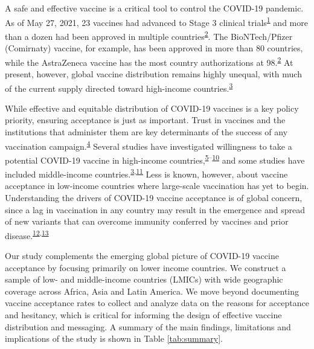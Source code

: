 \documentclass[
  12pt,
]{article}
\begin{document}
\newpage

A safe and effective vaccine is a critical tool to control the COVID-19 pandemic. As of May 27, 2021, 23 vaccines had advanced to Stage 3 clinical trials\textsuperscript{\protect\hyperlink{ref-who1}{1}} and more than a dozen had been approved in multiple countries\textsuperscript{\protect\hyperlink{ref-track}{2}}. The BioNTech/Pfizer (Comirnaty) vaccine, for example, has been approved in more than 80 countries, while the AstraZeneca vaccine has the most country authorizations at 98.\textsuperscript{\protect\hyperlink{ref-track}{2}} At present, however, global vaccine distribution remains highly unequal, with much of the current supply directed toward high-income countries.\textsuperscript{\protect\hyperlink{ref-wouters2021challenges}{3}}

While effective and equitable distribution of COVID-19 vaccines is a key policy priority, ensuring acceptance is just as important. Trust in vaccines and the institutions that administer them are key determinants of the success of any vaccination campaign.\textsuperscript{\protect\hyperlink{ref-defigueiredo2020lancet}{4}} Several studies have investigated willingness to take a potential COVID-19 vaccine in high-income countries,\textsuperscript{\protect\hyperlink{ref-boyon2020ipsos}{5}--\protect\hyperlink{ref-fisher2020attitudes}{10}} and some studies have included middle-income countries.\textsuperscript{\protect\hyperlink{ref-wouters2021challenges}{3},\protect\hyperlink{ref-lazarus2020nature}{11}} Less is known, however, about vaccine acceptance in low-income countries where large-scale vaccination has yet to begin. Understanding the drivers of COVID-19 vaccine acceptance is of global concern, since a lag in vaccination in any country may result in the emergence and spread of new variants that can overcome immunity conferred by vaccines and prior disease.\textsuperscript{\protect\hyperlink{ref-ong2021lack}{12},\protect\hyperlink{ref-lancettask}{13}}

Our study complements the emerging global picture of COVID-19 vaccine acceptance by focusing primarily on lower income countries. We construct a sample of low- and middle-income countries (LMICs) with wide geographic coverage across Africa, Asia and Latin America. We move beyond documenting vaccine acceptance rates to collect and analyze data on the reasons for acceptance and hesitancy, which is critical for informing the design of effective vaccine distribution and messaging. A summary of the main findings, limitations and implications of the study is shown in Table \ref{tab:summary}.
\end{document}
